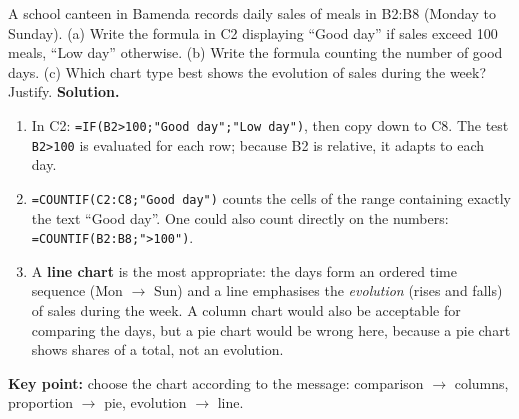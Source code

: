 \documentclass[11pt]{article}
\newcounter{popsec}
\newcounter{popsub}
\newcommand{\courssub}[1]{%
  \stepcounter{popsub}%
  \par\vspace{9pt}\noindent{\popxbold\fontsize{11.5}{13}\selectfont\color{popink}{\color{poporange}\thepopsec.\thepopsub}\hspace{6pt}#1}\par\nopagebreak\vspace{4pt}
}
\begin{document}
\begin{exoresolu}
A school canteen in Bamenda records daily sales of meals in B2:B8 (Monday to Sunday). (a) Write the formula in C2 displaying ``Good day'' if sales exceed 100 meals, ``Low day'' otherwise. (b) Write the formula counting the number of good days. (c) Which chart type best shows the evolution of sales during the week? Justify.
\tcblower
\textbf{Solution.}
\begin{enumerate}
\item[(a)] In C2: \texttt{=IF(B2>100;"Good day";"Low day")}, then copy down to C8. The test \texttt{B2>100} is evaluated for each row; because B2 is relative, it adapts to each day.
\item[(b)] \texttt{=COUNTIF(C2:C8;"Good day")} counts the cells of the range containing exactly the text ``Good day''. One could also count directly on the numbers: \texttt{=COUNTIF(B2:B8;">100")}.
\item[(c)] A \textbf{line chart} is the most appropriate: the days form an ordered time sequence (Mon $\rightarrow$ Sun) and a line emphasises the \emph{evolution} (rises and falls) of sales during the week. A column chart would also be acceptable for comparing the days, but a pie chart would be wrong here, because a pie chart shows shares of a total, not an evolution.
\end{enumerate}
\textbf{Key point:} choose the chart according to the message: comparison $\rightarrow$ columns, proportion $\rightarrow$ pie, evolution $\rightarrow$ line.
\end{exoresolu}

\courssub{Linking Worksheets}
\end{document}
